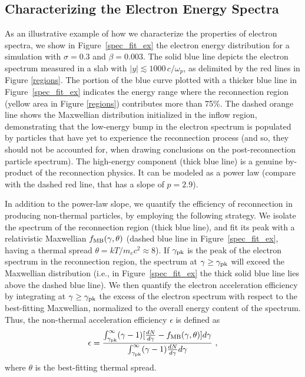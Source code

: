  
\subsection{Characterizing the Electron Energy Spectra}\label{chara}
As an illustrative example of how we characterize the properties of electron spectra, we show in Figure~\ref{spec_fit_ex} the electron energy distribution for a simulation with $\sigma=0.3$ and $\beta=0.003$. The solid blue line depicts the electron spectrum measured in a slab with $|y|\lesssim 1000\,c/\omega_{p}$, as delimited by the red lines in  Figure \ref{regions}. The portion of the blue curve plotted with a thicker blue line in Figure~\ref{spec_fit_ex} indicates the energy range where the reconnection region (yellow area in  Figure \ref{regions}) contributes more than 75\%. The dashed orange line shows the Maxwellian distribution initialized in the inflow region, demonstrating that the low-energy bump in the electron spectrum is populated by particles that have yet to experience the reconnection process (and so, they should not be accounted for, when drawing conclusions on the post-reconnection particle spectrum). The high-energy component (thick blue line) is a genuine by-product of the reconnection physics. It can be modeled as a power law (compare with the dashed red line, that has a slope of $p=2.9$).

In addition to the power-law slope, we quantify the efficiency of reconnection in producing non-thermal particles, by employing the following strategy. We isolate the spectrum of the reconnection region (thick blue line), and fit its peak with a relativistic Maxwellian $f_{\rm MB} (\gamma,\theta)$ (dashed blue line in Figure~\ref{spec_fit_ex}, having a thermal spread $\theta=kT/m_e c^2\approx8$). If $\gamma_{\rm pk}$ is the peak of the electron spectrum in the reconnection region, the spectrum at $\gamma\geq \gamma_{\rm pk}$ will exceed the Maxwellian distribution (i.e., in Figure~\ref{spec_fit_ex} the thick solid blue line lies above the dashed blue line).
We then quantify 
the electron acceleration efficiency by integrating at $\gamma\geq \gamma_{\rm pk}$ the excess of the electron spectrum with respect to the best-fitting Maxwellian, normalized to the overall energy content of the spectrum. Thus, the non-thermal acceleration efficiency $\epsilon$ is defined as
\begin{equation}
\epsilon= \frac{\int_{\gamma_{\rm{pk}}}^{\infty}(\gamma-1)[ \frac{dN}{d\gamma} -f_{\rm MB}(\gamma,\theta)]d\gamma}{\int_{\gamma_{\rm pk}}^{\infty}(\gamma-1) \frac{dN}{d\gamma}d\gamma}~,
\label{efficiency_eqn}
\end{equation}
where $\theta$ is the best-fitting thermal spread. 

